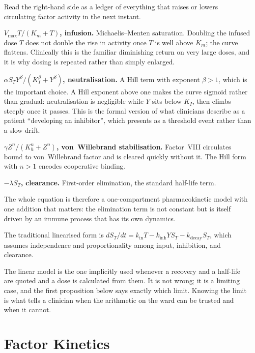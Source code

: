 \begin{reading}
Read the right-hand side as a ledger of everything that raises or lowers
circulating factor activity in the next instant.

\textbf{$V_{\max}T/(K_m+T)$, infusion.} Michaelis--Menten saturation. Doubling
the infused dose $T$ does not double the rise in activity once $T$ is well
above $K_m$; the curve flattens. Clinically this is the familiar diminishing
return on very large doses, and it is why dosing is repeated rather than simply
enlarged.

\textbf{$\alpha S_T Y^\beta/(K_I^\beta+Y^\beta)$, neutralisation.} A Hill term
with exponent $\beta>1$, which is the important choice. A Hill exponent above
one makes the curve sigmoid rather than gradual: neutralisation is negligible
while $Y$ sits below $K_I$, then climbs steeply once it passes. This is the
formal version of what clinicians describe as a patient ``developing an
inhibitor'', which presents as a threshold event rather than a slow drift.

\textbf{$\gamma Z^n/(K_h^n+Z^n)$, von~Willebrand stabilisation.} Factor~VIII
circulates bound to von~Willebrand factor and is cleared quickly without it.
The Hill form with $n>1$ encodes cooperative binding.

\textbf{$-\lambda S_T$, clearance.} First-order elimination, the standard
half-life term.

The whole equation is therefore a one-compartment pharmacokinetic model with
one addition that matters: the elimination term is not constant but is itself
driven by an immune process that has its own dynamics.
\end{reading}

\begin{definition}
\label{def:C_linear}
The traditional linearised form is
$dS_T/dt=k_{\text{in}}T-k_{\text{inh}}Y S_T-k_{\text{decay}}S_T$, which assumes
independence and proportionality among input, inhibition, and clearance.
\end{definition}

The linear model is the one implicitly used whenever a recovery and a half-life
are quoted and a dose is calculated from them. It is not wrong; it is a limiting
case, and the first proposition below says exactly which limit. Knowing the
limit is what tells a clinician when the arithmetic on the ward can be trusted
and when it cannot.

\section{Factor Kinetics}
\label{sec:C_kinetics}

